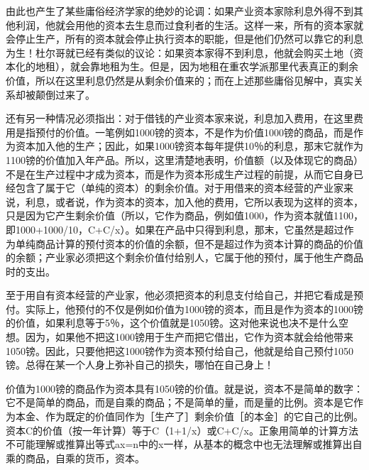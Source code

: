 由此也产生了某些庸俗经济学家的绝妙的论调：如果产业资本家除利息外得不到其他利润，他就会用他的资本去生息而过食利者的生活。这样一来，所有的资本家就会停止生产，所有的资本就会停止执行资本的职能，但是他们仍然可以靠它的利息为生！杜尔哥就已经有类似的议论：如果资本家得不到利息，他就会购买土地（资本化的地租），就会靠地租为生。但是，因为地租在重农学派那里代表真正的剩余价值，所以在这里利息仍然是从剩余价值来的；而在上述那些庸俗见解中，真实关系却被颠倒过来了。

还有另一种情况必须指出：对于借钱的产业资本家来说，利息加入费用，在这里费用是指预付的价值。一笔例如1000镑的资本，不是作为价值1000镑的商品，而是作为资本加入他的生产；因此，如果1000镑资本每年提供10％的利息，那末它就作为1100镑的价值加入年产品。所以，这里清楚地表明，价值额（以及体现它的商品）不是在生产过程中才成为资本，而是作为资本形成生产过程的前提，从而它自身已经包含了属于它（单纯的资本）的剩余价值。对于用借来的资本经营的产业家来说，利息，或者说，作为资本的资本，加入他的费用，它所以表现为这样的资本，只是因为它产生剩余价值（所以，它作为商品，例如值1000，作为资本就值1100，即1000+1000/10，C+C/x）。如果在产品中只得到利息，那末，它虽然是超过作为单纯商品计算的预付资本的价值的余额，但不是超过作为资本计算的商品的价值的余额；产业家必须把这个剩余价值付给别人，它属于他的预付，属于他生产商品时的支出。

至于用自有资本经营的产业家，他必须把资本的利息支付给自己，并把它看成是预付。实际上，他预付的不仅是例如价值为1000镑的资本，而且是作为资本的1000镑的价值，如果利息等于5％，这个价值就是1050镑。这对他来说也决不是什么空想。因为，如果他不把这1000镑用于生产而把它借出，它作为资本就会给他带来1050镑。因此，只要他把这1000镑作为资本预付给自己，他就是给自己预付1050镑。总得在某一个人身上弥补自己的损失，哪怕在自己身上！

价值为1000镑的商品作为资本具有1050镑的价值。就是说，资本不是简单的数字：它不是简单的商品，而是自乘的商品；不是简单的量，而是量的比例。资本是它作为本金、作为既定的价值同作为［生产了］剩余价值［的本金］的它自己的比例。资本C的价值（按一年计算）等于C（1+1/x）或C+C/x。正象用简单的计算方法不可能理解或推算出等式ax=n中的x一样，从基本的概念中也无法理解或推算出自乘的商品，自乘的货币，资本。

